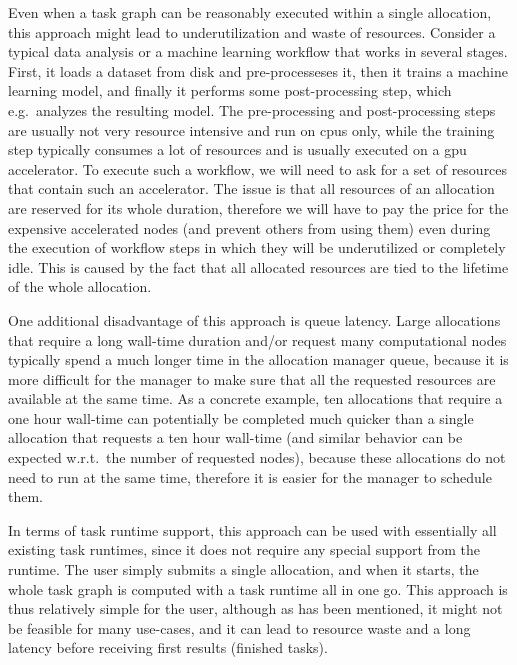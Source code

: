 Even when a task graph can be reasonably executed within a single allocation, this approach might
lead to underutilization and waste of resources. Consider a typical data analysis or a machine
learning workflow that works in several stages. First, it loads a dataset from disk and
pre-processeses it, then it trains a machine learning model, and finally it performs some
post-processing step, which e.g.\ analyzes the resulting model. The pre-processing and
post-processing steps are usually not very resource intensive and run on \glspl{cpu}
only, while the training step typically consumes a lot of resources and is usually executed on a
\gls{gpu} accelerator. To execute such a workflow, we will need to ask for a set
of resources that contain such an accelerator. The issue is that all resources of an allocation are
reserved for its whole duration, therefore we will have to pay the price for the expensive
accelerated nodes (and prevent others from using them) even during the execution of workflow steps
in which they will be underutilized or completely idle. This is caused by the fact that all
allocated resources are tied to the lifetime of the whole allocation.

One additional disadvantage of this approach is queue latency. Large allocations that require a
long wall-time duration and/or request many computational nodes typically spend a much longer time
in the allocation manager queue, because it is more difficult for the manager to make sure that all
the requested resources are available at the same time. As a concrete example, ten allocations that
require a one hour wall-time can potentially be completed much quicker than a single allocation
that requests a ten hour wall-time (and similar behavior can be expected w.r.t.\ the number of
requested nodes), because these allocations do not need to run at the same time, therefore it is
easier for the manager to schedule them.

In terms of task runtime support, this approach can be used with essentially all existing task
runtimes, since it does not require any special support from the runtime. The user simply submits a
single allocation, and when it starts, the whole task graph is computed with a task runtime all in
one go. This approach is thus relatively simple for the user, although as has been mentioned, it might
not be feasible for many use-cases, and it can lead to resource waste and a long latency before
receiving first results (finished tasks).

